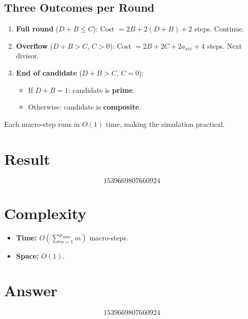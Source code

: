 \documentclass[12pt]{article}
\begin{document}
\subsection{Three Outcomes per Round}
\begin{enumerate}
    \item \textbf{Full round} ($D+B \leq C$): Cost $= 2B + 2(D+B) + 2$ steps. Continue.
    \item \textbf{Overflow} ($D+B > C$, $C > 0$): Cost $= 2B + 2C + 2a_{\mathrm{acc}} + 4$ steps. Next divisor.
    \item \textbf{End of candidate} ($D+B > C$, $C = 0$):
    \begin{itemize}
        \item If $D+B = 1$: candidate is \textbf{prime}.
        \item Otherwise: candidate is \textbf{composite}.
    \end{itemize}
\end{enumerate}

Each macro-step runs in $O(1)$ time, making the simulation practical.

\section{Result}
\[
    \boxed{1539669807660924}
\]

\section{Complexity}
\begin{itemize}
    \item \textbf{Time:} $O\!\left(\sum_{m=1}^{p_{10001}} m\right)$ macro-steps.
    \item \textbf{Space:} $O(1)$.
\end{itemize}

\section{Answer}

\[
\boxed{1539669807660924}
\]
\end{document}
